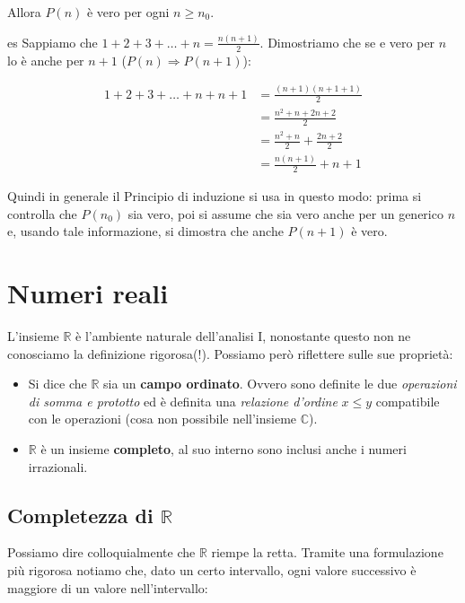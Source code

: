 \documentclass[x11names]{article}
\begin{document}
	\noindent
	Allora  $P(n)$ è vero per ogni $n \geq n_0$.
	
	\begin{es}{es}
		Sappiamo che $1+2+3+\dots+n = \frac{n(n+1)}{2}$. Dimostriamo che se e vero per $n$ lo è anche per $n+1$ ($P(n) \Rightarrow P(n+1)$):
		
		\begin{align*}
			1+2+3+\dots+n+n+1 & = \frac{(n+1)(n+1+1)}{2} \\ & = \frac{n^2 + n +2n + 2}{2} \\ & = \frac{n^2 + n}{2} + \frac{2n + 2}{2} \\ &=  \frac{n(n+1)}{2} + n+1 
		\end{align*}
		
	\end{es}
	\vspace{0.7em}
	\noindent
	Quindi in generale il Principio di induzione si usa in questo modo: prima si controlla che $P(n_0)$ sia vero, poi si assume che sia vero anche per un generico $n$ e, usando tale informazione, si dimostra che anche $P(n+1)$ è vero.
	
	\newpage
	\section{Numeri reali}
	L'insieme $\mathbb{R}$ è l'ambiente naturale dell'analisi I, nonostante questo non ne conosciamo la definizione rigorosa(!). Possiamo però riflettere sulle sue proprietà:
	\begin{itemize}
		\item Si dice che $\mathbb{R}$ sia un \textbf{campo ordinato}. Ovvero sono definite le due \textit{operazioni di somma e prototto} ed è definita una \textit{relazione d'ordine} $x \leq y$ compatibile con le operazioni (cosa non possibile nell'insieme $\mathbb{C}$).
		\item $\mathbb{R}$ è un insieme \textbf{completo}, al suo interno sono inclusi anche i numeri irrazionali.
	\end{itemize}
	
	\noindent
	\subsection{Completezza di $\mathbb{R}$}
	
	Possiamo dire colloquialmente che $\mathbb{R}$ riempe la retta. Tramite una formulazione più rigorosa notiamo che, dato un certo intervallo, ogni valore successivo è maggiore di un valore nell'intervallo:
\end{document}
